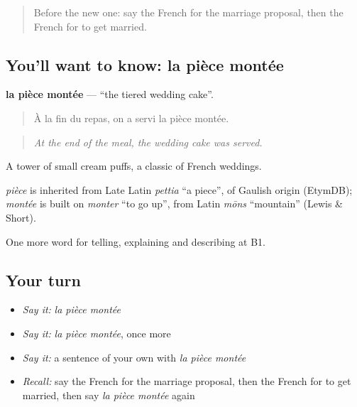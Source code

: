 \begin{quote}
Before the new one: say the French for the marriage proposal, then the French for to get married.
\end{quote}

\subsection*{You'll want to know: la pièce montée}
\textbf{la pièce montée} — \textquotedblleft{}the tiered wedding cake\textquotedblright{}.

\begin{quote}
À la fin du repas, on a servi la pièce montée.
\end{quote}

\begin{quote}
\emph{At the end of the meal, the wedding cake was served.}
\end{quote}

A tower of small cream puffs, a classic of French weddings.

\begin{cousinweb}
\emph{pièce} is inherited from Late Latin \emph{pettia} \textquotedblleft{}a piece\textquotedblright{}, of Gaulish origin (EtymDB); \emph{montée} is built on \emph{monter} \textquotedblleft{}to go up\textquotedblright{}, from Latin \emph{mōns} \textquotedblleft{}mountain\textquotedblright{} (Lewis \& Short).
\end{cousinweb}

\begin{grammarlens}[title={What you've built}]
One more word for telling, explaining and describing at B1.
\end{grammarlens}

\subsection*{Your turn}
\begin{itemize}
\raggedright
  \item \emph{Say it:} \emph{la pièce montée}
  \item \emph{Say it:} \emph{la pièce montée}, once more
  \item \emph{Say it:} a sentence of your own with \emph{la pièce montée}
  \item \emph{Recall:} say the French for the marriage proposal, then the French for to get married, then say \emph{la pièce montée} again
\end{itemize}

